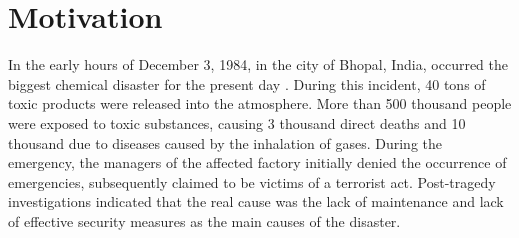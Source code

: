 


\section{Motivation}

In the early hours of December 3, 1984, in the city of Bhopal, India, occurred the biggest chemical disaster for the present day \cite{broughton2005bhopal}. During this incident, 40 tons of toxic products were released into the atmosphere. More than 500 thousand people were exposed to toxic substances, causing 3 thousand direct deaths and 10 thousand due to diseases caused by the inhalation of gases. During the emergency, the managers of the affected factory initially denied the occurrence of emergencies, subsequently claimed to be victims of a terrorist act. Post-tragedy investigations indicated that the real cause was the lack of maintenance and lack of effective security measures as the main causes of the disaster. 

